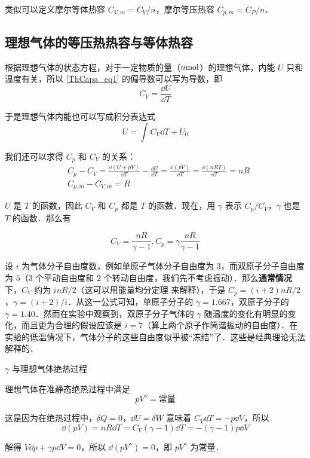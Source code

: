 类似可以定义摩尔等体热容 $C_{V,m}=C_V/n$，摩尔等压热容 $C_{p,m}=C_P/n$．

\subsection{理想气体的等压热热容与等体热容}

根据理想气体的状态方程，对于一定物质的量（$n \rm{mol}$）的理想气体，内能 $U$ 只和温度有关，所以 \autoref{ThCapa_eq1} 的偏导数可以写为导数，即
\begin{equation}
C_V=\frac{\dd U}{\dd T}
\end{equation}

于是理想气体内能也可以写成积分表达式
\begin{equation}
U=\int C_V\dd T + U_0
\end{equation}

我们还可以求得 $C_p$ 和 $C_V$ 的关系：
\begin{align}
&C_p-C_V=\frac{\dd (U+pV)}{\dd T}-\frac{\dd U}{\dd T}=\frac{\dd(pV)}{\dd T}=\frac{\dd (nRT)}{\dd T}=nR\\
&C_{p,m}-C_{V,m}=R
\end{align}

$U$ 是 $T$ 的函数，因此 $C_V$ 和 $C_p$ 都是 $T$ 的函数．现在，用 $\gamma$ 表示 $C_p/C_V$，$\gamma$ 也是 $T$ 的函数．那么有

\begin{equation}
C_V=\frac{nR}{\gamma-1},C_p=\gamma\frac{nR}{\gamma-1}
\end{equation}

设 $i$ 为气体分子自由度数，例如单原子气体分子自由度为 $3$，而双原子分子自由度为 $5$（$3$ 个平动自由度和 $2$ 个转动自由度，我们先不考虑振动）．那么\textbf{通常情况}下，$C_V$ 约为 $inR/2$（这可以用能量均分定理 来解释），于是 $C_p=(i+2)nR/2$，$\gamma=(i+2)/i$．从这一公式可知，单原子分子的 $\gamma=1.667$，双原子分子的 $\gamma=1.40$．然而在实验中观察到，双原子分子气体的 $\gamma$ 随温度的变化有明显的变化，而且更为合理的假设应该是 $i=7$（算上两个原子作简谐振动的自由度）．在实验的低温情况下，气体分子的这些自由度似乎被“冻结”了．这些是经典理论无法解释的．
\begin{example}{$\gamma$ 与理想气体绝热过程}

理想气体在准静态绝热过程中满足
\begin{equation}
pV^{\gamma}=\text{常量}
\end{equation}

这是因为在绝热过程中，$\delta{Q}=0$，$\dd{U}=\delta{W}$ 意味着 $C_V\dd{T}=-p\dd{V}$，所以
\begin{equation}
\dd(pV)=nR\dd{T}=C_V(\gamma-1)\dd{T}=-(\gamma-1)p\dd{V}
\end{equation}

解得 $V\dd{p}+\gamma p\dd{V} = 0$，所以 $\dd{(pV^\gamma)}=0$，即 $pV^{\gamma}$ 为常量．
\end{example}

